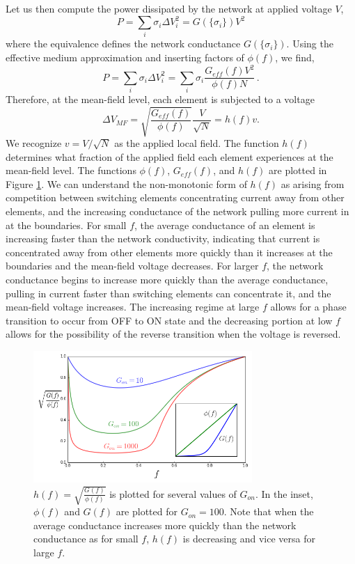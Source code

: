 \documentclass[aps,prl,reprint,groupedaddress]{revtex4-1}
\begin{document}
Let us then compute the power dissipated by the network at applied
voltage $V$,
\begin{equation}
P = \sum_i \sigma_i \Delta V_i^2 = G(\{\sigma_i\}) V^2
\end{equation}
where the equivalence defines the network conductance $G(\{\sigma_i\})$.
Using the effective medium approximation and inserting factors of $\phi(f)$,
we find,
\begin{equation}
P = \sum_i \sigma_i \Delta V_i^2 = \sum_i \sigma_i \frac{G_{eff}(f)V^2}
{\phi(f) N}\,.
\end{equation}
Therefore, at the mean-field level, each element is subjected to a voltage
\begin{equation}
\Delta V_{MF} = \sqrt{\frac{G_{eff}(f)}{\phi(f)}}\frac{V}{\sqrt{N}}
= h(f) v.
\end{equation}
We recognize $v=V/\sqrt{N}$ as the applied local field.  The function
$h(f)$ determines what fraction of the applied field each element
experiences at the mean-field level.  The functions $\phi(f)$, $G_{eff}(f)$,
and $h(f)$ are plotted in Figure \ref{MF_voltage_fig}. We can understand the non-monotonic
form of $h(f)$ as arising from competition between switching elements
concentrating current away from other elements, and the increasing conductance
of the network pulling more current in at the boundaries.  For small $f$, the
average conductance of an element is increasing faster than the network
conductivity, indicating that current is concentrated away from other elements
more quickly than it increases at the boundaries and the mean-field voltage
decreases.  For larger $f$, the network conductance begins to increase more
quickly than the average conductance, pulling in current faster than switching
elements can concentrate it, and the mean-field voltage increases.  The
increasing regime at large $f$ allows for a phase transition to occur from
OFF to ON state and the decreasing portion at low $f$ allows for the possibility
of the reverse transition when the voltage is reversed.  


\begin{figure}
\includegraphics[width=8.3cm]{MF_voltage.png}
\caption{ $h(f) = \sqrt{\frac{G(f)}{\phi(f)}}$ is plotted for several values of
$G_{on}$.  In the inset, $\phi(f)$ and $G(f)$ are plotted for $G_{on}=100$.
Note that when the average conductance increases more quickly than the network
conductance as for small $f$, $h(f)$ is decreasing and vice versa
for large $f$.\label{MF_voltage_fig}}
\end{figure}
\end{document}
